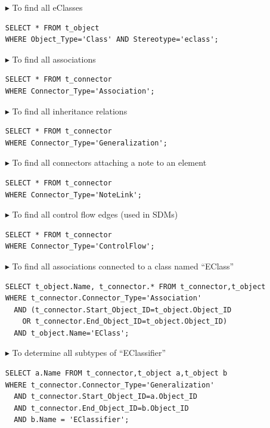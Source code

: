 \begin{itemize}

\item[$\blacktriangleright$] To find all eClasses
\begin{lstlisting}[frame=single,framerule=0pt]
SELECT * FROM t_object
WHERE Object_Type='Class' AND Stereotype='eclass';
\end{lstlisting}

\item[$\blacktriangleright$] To find all associations
\begin{lstlisting}[frame=single,framerule=0pt]
SELECT * FROM t_connector
WHERE Connector_Type='Association';
\end{lstlisting}

\item[$\blacktriangleright$] To find all inheritance relations
\begin{lstlisting}[frame=single,framerule=0pt]
SELECT * FROM t_connector
WHERE Connector_Type='Generalization';
\end{lstlisting}

\item[$\blacktriangleright$] To find all connectors attaching a note to an element
\begin{lstlisting}[frame=single,framerule=0pt]
SELECT * FROM t_connector
WHERE Connector_Type='NoteLink';
\end{lstlisting}

\item[$\blacktriangleright$] To find all control flow edges (used in SDMs)
\begin{lstlisting}[frame=single,framerule=0pt]
SELECT * FROM t_connector
WHERE Connector_Type='ControlFlow';
\end{lstlisting}

\item[$\blacktriangleright$] To find all associations connected to a class named ``EClass''
\begin{lstlisting}[frame=single,framerule=0pt]
SELECT t_object.Name, t_connector.* FROM t_connector,t_object
WHERE t_connector.Connector_Type='Association'
  AND (t_connector.Start_Object_ID=t_object.Object_ID
    OR t_connector.End_Object_ID=t_object.Object_ID)
  AND t_object.Name='EClass';
\end{lstlisting}

\item[$\blacktriangleright$] To determine all subtypes of ``EClassifier''
\begin{lstlisting}[frame=single,framerule=0pt]
SELECT a.Name FROM t_connector,t_object a,t_object b
WHERE t_connector.Connector_Type='Generalization'
  AND t_connector.Start_Object_ID=a.Object_ID
  AND t_connector.End_Object_ID=b.Object_ID
  AND b.Name = 'EClassifier';
\end{lstlisting}


\end{itemize}

